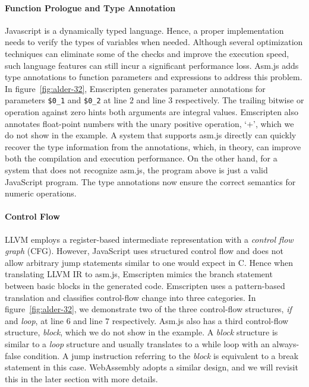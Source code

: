 \paragraph{Function Prologue and Type Annotation}
Javascript is a dynamically typed language. Hence, a proper implementation needs
to verify the types of variables when needed. Although several optimization
techniques can eliminate some of the checks and improve the execution speed,
such language features can still incur a significant performance loss. Asm.js
adds type annotations to function parameters and expressions to address this
problem. In figure~\ref{fig:alder-32}, Emscripten generates parameter
annotations for parameters \texttt{\$0\_1} and \texttt{\$0\_2} at
line $2$ and line $3$ respectively. The trailing bitwise or operation against
zero hints both arguments are integral values. Emscripten also annotates
float-point numbers with the unary positive operation, `+', which we do not
show in the example. A system that supports asm.js directly can quickly recover
the type information from the annotations, which, in theory, can improve both
the compilation and execution performance. On the other hand, for a system that
does not recognize asm.js, the program above is just a valid JavaScript program.
The type annotations now ensure the correct semantics for numeric operations.

\paragraph{Control Flow}
LLVM employs a register-based intermediate representation with a
\emph{control flow graph} (CFG). However, JavaScript uses structured control
flow and does not allow arbitrary jump statements similar to one would expect
in C. Hence when translating LLVM IR to asm.js, Emscripten mimics the branch
statement between basic blocks in the generated code. Emscripten uses a
pattern-based translation and classifies control-flow change into three
categories. In figure~\ref{fig:alder-32}, we demonstrate two of the three
control-flow structures, \emph{if} and \emph{loop}, at line $6$ and line $7$
respectively. Asm.js also has a third control-flow structure, \emph{block},
which we do not show in the example. A \emph{block} structure is similar to a
\emph{loop} structure and usually translates to a while loop with an
always-false condition. A jump instruction referring to the \emph{block} is
equivalent to a break statement in this case. WebAssembly adopts a similar
design, and we will revisit this in the later section with more details.


